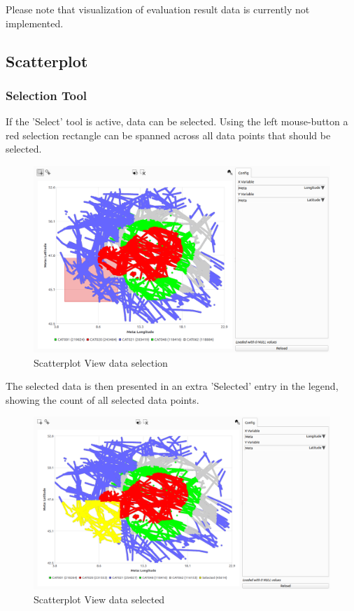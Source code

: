 Please note that visualization of evaluation result data is currently not implemented.

\subsection{Scatterplot}

\subsubsection{Selection Tool}

If the 'Select' tool is active, data can be selected. Using the left mouse-button a red selection rectangle can be spanned across all data points that should be selected.

\begin{figure}[H]
    \hspace*{-2cm}
    \includegraphics[width=18cm,frame]{figures/scatter_select.png}
  \caption{Scatterplot View data selection}
\end{figure}

The selected data is then presented in an extra 'Selected' entry in the legend, showing the count of all selected data points.

\begin{figure}[H]
    \hspace*{-2cm}
    \includegraphics[width=18cm,frame]{figures/scatter_selected.png}
  \caption{Scatterplot View data selected}
\end{figure}

